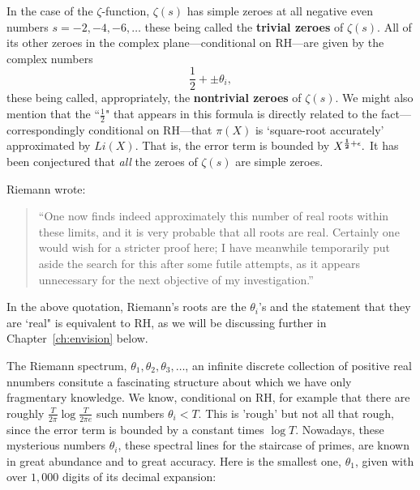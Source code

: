 \documentclass[openany]{book}
\theoremstyle{plain}
\theoremstyle{definition}
\begin{document}
In the case of the $\zeta$-function, $\zeta(s)$ has simple zeroes  at all negative even numbers $s=-2,-4,-6,\dots$ these being called the {\bf trivial zeroes} of $\zeta(s)$. All of its other zeroes in the complex plane---conditional on RH---are given by  the complex numbers $${\frac{1}{2}} +\pm\theta_i,$$ these being called, appropriately, the {\bf nontrivial zeroes} of $\zeta(s)$.    We might also mention that the ``${\frac{1}{2}}$" that appears in this formula is directly related to the fact---correspondingly conditional on RH---that $\pi(X)$ is `square-root accurately' approximated by $Li(X)$.  That is, the error term is bounded by $X^{{\bf{\frac{1}{2}}}+\epsilon}.$  It has been conjectured that {\it all} the zeroes of $\zeta(s)$ are simple zeroes.

Riemann wrote:
 \begin{quote}
  ``One now finds indeed approximately this number of real roots
  within these limits, and it is very probable that all roots are
  real. Certainly one would wish for a stricter proof here; I have
  meanwhile temporarily put aside the search for this after some
  futile attempts, as it appears unnecessary for the next objective of
  my investigation.''
\end{quote}

 In the above quotation, Riemann's roots are the $\theta_i$'s and the statement that they are `real" is equivalent to RH, as we will be discussing further in Chapter~\ref{ch:envision} below.


  The Riemann spectrum, $\theta_1, \theta_2, \theta_3, \dots$, an infinite discrete collection of positive real nnumbers consitute a fascinating structure about which we have only fragmentary knowledge.  We know, conditional on RH, for example that there are roughly ${\frac{T}{2\pi}}\log {\frac{T}{2\pi e}}$ such numbers $\theta_i < T$.  This is 'rough' but not all that rough, since the error term is bounded by a constant times $\log T$.
Nowadays, these mysterious numbers $\theta_i$, these spectral lines for the
staircase of primes, are known in great abundance and to great accuracy.  Here is the smallest
one, $\theta_1$, given with over $1{,}000$ digits of its decimal
expansion:
\end{document}
